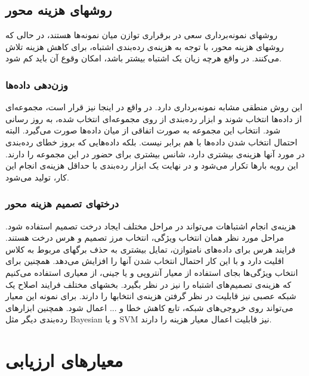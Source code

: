 \documentclass{article}
\begin{document}
\subsection{روشهای هزینه محور}
روشهای نمونه‌برداری سعی در برقراری توازن میان نمونه‌ها هستند، در حالی که روشهای هزینه محور، با توجه به هزینه‌ی رده‌بندی اشتباه، برای کاهش هزینه تلاش می‌کنند. در واقع هرچه زیان یک اشتباه بیشتر باشد، امکان وقوع آن باید کم شود.

\subsubsection{وزن‌دهی داده‌ها}
این روش منطقی مشابه نمونه‌برداری دارد. در واقع در اینجا نیز قرار است، مجموعه‌ای از داده‌ها انتخاب شوند و ابزار رده‌بندی از روی مجموعه‌ای انتخاب شده، به روز رسانی شود. انتخاب این مجموعه به صورت اتفاقی از میان داده‌ها صورت می‌گیرد. البته احتمال انتخاب شدن داده‌ها با هم برابر نیست. بلکه داده‌هایی که بروز خطای رده‌بندی در مورد آنها هزینه‌ی بیشتری دارد، شانس بیشتری برای حضور در این مجموعه را دارند. این رویه بارها تکرار می‌شود و در نهایت یک ابزار رده‌بندی با حداقل هزینه‌ی انجام این کار، تولید می‌شود.
\subsubsection{درختهای تصمیم هزینه محور}
هزینه‌ی انجام اشتباهات می‌تواند در مراحل مختلف ایجاد درخت تصمیم استفاده شود. مراحل مورد نظر همان انتخاب ویژگی، انتخاب مرز تصمیم و هرس درخت هستند. فرایند هرس برای داده‌های نامتوازن، تمایل بیشتری به حذف برگهای مربوط به کلاس اقلیت دارد و با این کار احتمال انتخاب شدن آنها را افزایش می‌دهد. همچنین برای انتخاب ویژگی‌ها بجای استفاده از معیار آنتروپی و یا جینی، از معیاری استفاده می‌کنیم که هزینه‌ی تصمیم‌های اشتباه را نیز در نظر بگیرد.
بخشهای مختلف فرایند اصلاح یک شبکه عصبی نیز قابلیت در نظر گرفتن هزینه‌ی انتخابها را دارند. برای نمونه این معیار می‌تواند روی خروجی‌های شبکه، تابع کاهش خطا و ... اعمال شود. همچنین ابزارهای رده‌بندی دیگر مثل Bayesian و یا SVM نیز قابلیت اعمال معیار هزینه را دارند.

\section{معیارهای ارزیابی}
\end{document}
